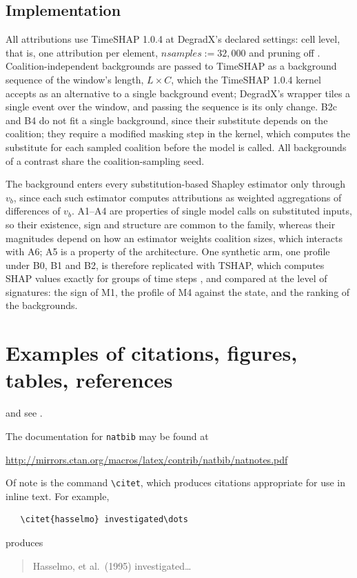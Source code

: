 \documentclass{article}
\begin{document}
\subsection{Implementation}\label{sec:eval:impl}

All attributions use TimeSHAP 1.0.4 at DegradX's declared settings: cell level, that is, one attribution per element, $\textit{nsamples}:=32{,}000$ and pruning off \citep{bento2021timeshap, degradxrepo}. Coalition-independent backgrounds are passed to TimeSHAP as a background sequence of the window's length, $L\times C$, which the TimeSHAP 1.0.4 kernel accepts as an alternative to a single background event; DegradX's wrapper tiles a single event over the window, and passing the sequence is its only change. B2c and B4 do not fit a single background, since their substitute depends on the coalition; they require a modified masking step in the kernel, which computes the substitute for each sampled coalition before the model is called. All backgrounds of a contrast share the coalition-sampling seed.

The background enters every substitution-based Shapley estimator only through $v_b$, since each such estimator computes attributions as weighted aggregations of differences of $v_b$. A1--A4 are properties of single model calls on substituted inputs, so their existence, sign and structure are common to the family, whereas their magnitudes depend on how an estimator weights coalition sizes, which interacts with A6; A5 is a property of the architecture. One synthetic arm, one profile under B0, B1 and B2, is therefore replicated with TSHAP, which computes SHAP values exactly for groups of time steps \citep{nguyen2025tshap}, and compared at the level of signatures: the sign of M1, the profile of M4 against the state, and the ranking of the backgrounds.


\section{Examples of citations, figures, tables, references}
\label{sec:others}
\lipsum[8] \cite{kour2014real,kour2014fast} and see \cite{hadash2018estimate}.

The documentation for \verb+natbib+ may be found at
\begin{center}
  \url{http://mirrors.ctan.org/macros/latex/contrib/natbib/natnotes.pdf}
\end{center}
Of note is the command \verb+\citet+, which produces citations
appropriate for use in inline text.  For example,
\begin{verbatim}
   \citet{hasselmo} investigated\dots
\end{verbatim}
produces
\begin{quote}
  Hasselmo, et al.\ (1995) investigated\dots
\end{quote}
\end{document}
